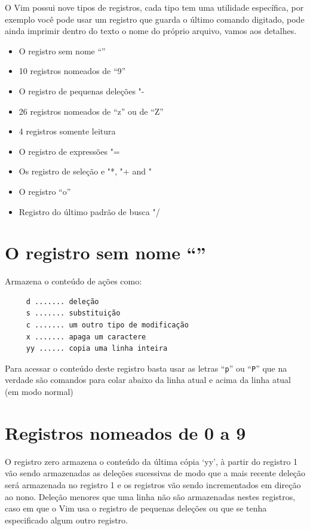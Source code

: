 \documentclass[10pt,a4paper,openany]{book}
\begin{document}
O Vim possui nove tipos de registros, cada tipo tem uma utilidade
específica, por exemplo você pode usar um registro que guarda o último
comando digitado, pode ainda imprimir dentro do texto o nome do
próprio arquivo, vamos aos detalhes.

\begin{itemize}
   \item O registro sem nome ``''
   \item 10 registros nomeados de ``9''
   \item O registro de pequenas deleções "-
   \item 26 registros nomeados de ``z'' ou de ``Z''
   \item 4 registros somente leitura
   \item O registro de expressões "=
   \item Os registro de seleção e  "*, "+ and "~
   \item O registro ``o''
   \item Registro do último padrão de busca "/
\end{itemize}

\section{O registro sem nome ``''}
\label{O registro sem nome ``''}

Armazena o conteúdo de ações como:

\begin{verbatim}
     d ....... deleção
     s ....... substituição
     c ....... um outro tipo de modificação
     x ....... apaga um caractere
     yy ...... copia uma linha inteira
\end{verbatim}

Para acessar o conteúdo deste registro basta usar as letras ``{\tt p}'' ou ``{\tt P}'' que
na verdade são comandos para colar abaixo da linha atual e acima da
linha atual (em modo normal)

\section{Registros nomeados de 0 a 9}
\label{Registros nomeados de 0 a 9}

O registro zero armazena o conteúdo da última cópia `yy', à partir do
registro 1 vão sendo armazenadas as deleções sucessivas de modo que a
mais recente deleção será armazenada no registro 1 e os registros vão
sendo incrementados em direção ao nono.  Deleção menores que uma linha
não são armazenadas nestes registros, caso em que o Vim usa o registro
de pequenas deleções ou que se tenha especificado algum outro
registro.
\end{document}
